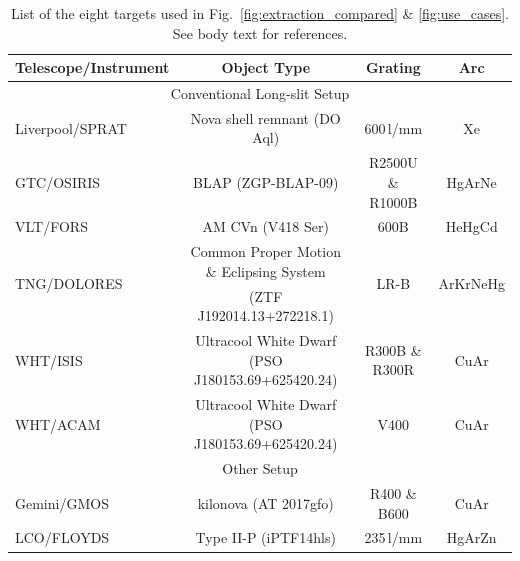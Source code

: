 \documentclass[linenumbers, twocolumn]{aastex631}
\begin{document}
\begin{table}
    \begin{tabular}{l|c|c|c}\hline
        Telescope/Instrument & Object Type                                 & Grating             & Arc \\\hline\hline
        \multicolumn{4}{c}{Conventional Long-slit Setup}\\\hline
        Liverpool/SPRAT      & Nova shell remnant (DO Aql)                 & 600\,l/mm           & Xe \\
        GTC/OSIRIS           & BLAP (ZGP-BLAP-09)                          & R2500U \& R1000B    & HgArNe \\
        VLT/FORS             & AM CVn (V418 Ser)                           & 600B                & HeHgCd \\
        \multirow{2}{*}{TNG/DOLORES}          & Common Proper Motion \& Eclipsing System     & \multirow{2}{*}{LR-B}                & \multirow{2}{*}{ArKrNeHg} \\
                             & (ZTF J192014.13+272218.1)     &           &  \\
        WHT/ISIS             & Ultracool White Dwarf (PSO J180153.69+625420.24)       & R300B \& R300R      & CuAr \\
        WHT/ACAM             & Ultracool White Dwarf (PSO J180153.69+625420.24)       & V400                & CuAr \\\hline
        \multicolumn{4}{c}{Other Setup}\\\hline
        Gemini/GMOS          & kilonova (AT 2017gfo)                       & R400 \& B600        & CuAr \\
        LCO/FLOYDS           & Type II-P (iPTF14hls)                       & 235\,l/mm           & HgArZn \\\hline
\end{tabular}
    \caption{List of the eight targets used in Fig.~\ref{fig:extraction_compared} \& \ref{fig:use_cases}. See body text for references.}
    \label{tab:my_label}
\end{table}
\end{document}
